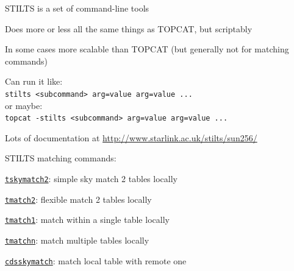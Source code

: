 \documentclass[20pt,landscape]{foils}
\newcommand{\bhref}[2]{\href{#1}{{\color{blue}#2}}}
\newcommand{\burl}[1]{{\color{blue}\url{#1}}}
\begin{document}
\vspace*{-0.2cm}
\begin{list0}
  \item STILTS is a set of command-line tools
  \begin{list2big}
    \item Does more or less all the same things as TOPCAT, but scriptably
\vspace*{-0.2cm}
    \item In some cases more scalable than TOPCAT
          (but generally not for matching commands)
\vspace*{-0.2cm}
    \item Can run it like:\\
          \hspace*{3em}
          {\color{brown}\verb|stilts <subcommand> arg=value arg=value ...|} \\
          or maybe: \\
          \hspace*{3em}
          {\color{brown}\verb|topcat -stilts <subcommand> arg=value arg=value ...|}
    \item Lots of documentation at
          \burl{http://www.starlink.ac.uk/stilts/sun256/}
  \end{list2big}
  \item STILTS matching commands:
  \begin{list2}
\vspace*{-0.2cm}
    \item[] \bhref{http://www.starlink.ac.uk/stilts/sun256/tskymatch2.html}
                  {\tt tskymatch2}: simple sky match 2 tables locally
\vspace*{-0.2cm}
    \item[] \bhref{http://www.starlink.ac.uk/stilts/sun256/tmatch2.html}
                  {\tt tmatch2}: flexible match 2 tables locally
\vspace*{-0.2cm}
    \item[] \bhref{http://www.starlink.ac.uk/stilts/sun256/tmatch1.html}
                  {\tt tmatch1}: match within a single table locally
\vspace*{-0.2cm}
    \item[] \bhref{http://www.starlink.ac.uk/stilts/sun256/tmatchn.html}
                  {\tt tmatchn}: match multiple tables locally
\vspace*{-0.2cm}
    \item[] \bhref{http://www.starlink.ac.uk/stilts/sun256/cdsskymatch.html}
                  {\tt cdsskymatch}: match local table with remote one

\end{list2}
\end{list0}
\end{document}
